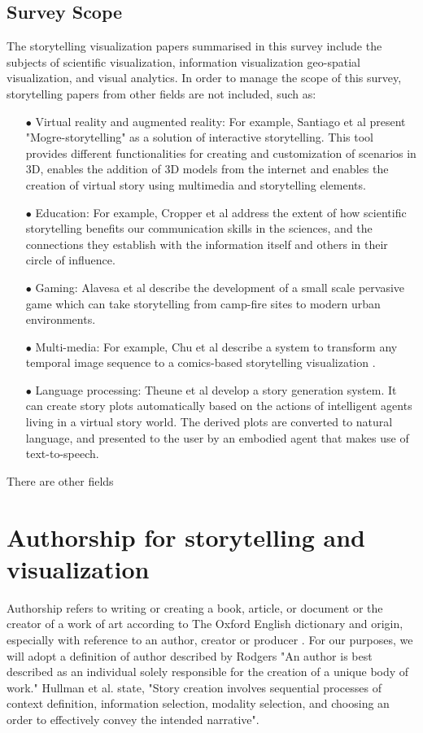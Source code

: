 \documentclass{egpubl}
\begin{document}
\subsection{Survey Scope}
The storytelling visualization papers summarised in this survey include the subjects of scientific visualization, information visualization geo-spatial visualization, and visual analytics. In order to manage the scope of this survey, storytelling papers from other fields are not included, such as:
\begin{enumerate}
	\item[$\bullet$] Virtual reality and augmented reality: For example, Santiago et al \cite{santiago2014mogre} present "Mogre-storytelling" as a solution of interactive storytelling. This tool provides different functionalities for creating and customization of scenarios in 3D, enables the addition of 3D models from the internet and enables the creation of virtual story using multimedia and storytelling elements.
	\item[$\bullet$] Education:  For example, Cropper et al \cite{cropper2015scientific} address the extent of how scientific storytelling benefits our communication skills in the sciences, and the connections they establish with the information itself and others in their circle of influence.
	\item[$\bullet$] Gaming: Alavesa et al\cite{alavesa2013combining} describe the development of a small scale pervasive game which can take storytelling from camp-fire sites to modern urban environments. 
	\item[$\bullet$] Multi-media: For example, Chu et al describe a system to transform any temporal image sequence to a comics-based storytelling visualization \cite{chu2015}. 
	\item[$\bullet$] Language processing: Theune et al \cite{theune2006generating} develop a story generation system. It can create story plots automatically based on the actions of intelligent agents living in a virtual story world. The derived plots are converted to natural language, and presented to the user by an embodied agent that makes use of text-to-speech.
\end{enumerate}
There are other fields
\section{Authorship for storytelling and visualization}
Authorship refers to writing or creating a book, article, or document or the creator of a work of art according to The Oxford English dictionary\cite{authoship2} and origin, especially with reference to an author, creator or producer \cite{authoship1}. For our purposes, we will adopt a definition of author described by Rodgers\cite{rodgers2011} "An author is best described as an individual solely responsible for the creation of a unique body of work."  Hullman \cite{hullman2013deeper} et al. state, "Story creation involves sequential processes of context definition, information selection, modality selection, and choosing an order to effectively convey the intended narrative".
\end{document}
